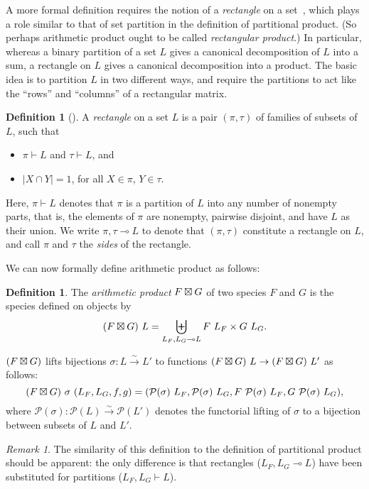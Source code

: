 \documentclass[preprint,authoryear]{sigplanconf}
\newcommand{\term}[1]{\emph{#1}}
\newcommand{\mcal}[1]{\ensuremath{\mathcal{#1}}}
\newcommand{\intersect}{\cap}
\newcommand{\powerset}{\mcal P}
\newcommand{\partition}{\vdash}
\newcommand{\rectangle}{\multimap}
\newcommand{\bij}{\stackrel{\sim}{\longrightarrow}}
\theoremstyle{definition}
\newtheorem{defn}[thm]{Definition}
\theoremstyle{remark}
\newtheorem*{rem}{Remark}
\begin{document}
A more formal definition requires the notion of a \term{rectangle} on
a set~\citep{Maia2008arithmetic, XXX}, which plays a role similar to
that of set partition in the definition of partitional product. (So
perhaps arithmetic product ought to be called \emph{rectangular
  product}.)  In particular, whereas a binary partition of a set $L$
gives a canonical decomposition of $L$ into a sum, a rectangle on $L$
gives a canonical decomposition into a product.  The basic idea is to
partition $L$ in two different ways, and require the partitions to act
like the ``rows'' and ``columns'' of a rectangular matrix.

\begin{defn}[\citet{Maia2008arithmetic}]
  \label{defn:rectangle}
  A \term{rectangle} on a set $L$ is a pair $(\pi, \tau)$ of families
  of subsets of $L$, such that
  \begin{itemize}
  \item $\pi \partition L$ and $\tau \partition L$, and
  \item $|X \intersect Y| = 1$, for all $X \in \pi$, $Y \in \tau$.
  \end{itemize}
  Here, $\pi \partition L$ denotes that $\pi$ is a partition of $L$
  into any number of nonempty parts, that is, the elements of $\pi$
  are nonempty, pairwise disjoint, and have $L$ as their union.  We
  write $\pi,\tau \rectangle L$ to denote that $(\pi,\tau)$ constitute
  a rectangle on $L$, and call $\pi$ and $\tau$ the \term{sides} of
  the rectangle.
\end{defn}

We can now formally define arithmetic product as follows:

\begin{defn}
  The \term{arithmetic product} $F \boxtimes G$ of two species $F$ and
  $G$ is the species defined on objects by \[ (F \aprod G)\ L =
  \biguplus_{L_F, L_G \rectangle L} F\ L_F \times G\ L_G. \]

  $(F \boxtimes G)$ lifts bijections $\sigma : L \bij L'$ to functions
  $(F \boxtimes G)\ L \to (F \boxtimes G)\ L'$ as follows: \[ (F \aprod G)\
  \sigma\ (L_F, L_G, f, g) = (\powerset(\sigma)\ L_F,
  \powerset(\sigma)\ L_G, F\ \powerset(\sigma)\ L_F, G\
  \powerset(\sigma)\ L_G), \] where $\powerset(\sigma) : \powerset(L)
  \bij \powerset(L')$ denotes the functorial lifting of $\sigma$ to a
  bijection between subsets of $L$ and $L'$.
\end{defn}

\begin{rem}
  The similarity of this definition to the definition of partitional
  product should be apparent: the only difference is that rectangles
  ($L_F,L_G \rectangle L$) have been substituted for partitions
  ($L_F,L_G \partition L$).
\end{rem}
\end{document}
